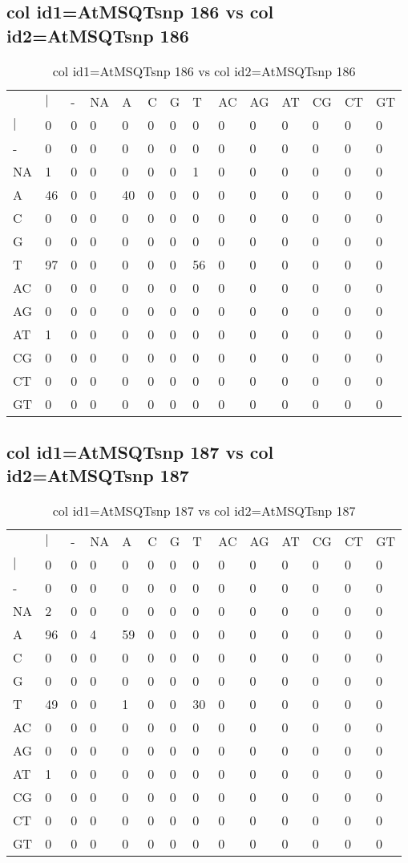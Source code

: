 \subsection{col id1=AtMSQTsnp 186 vs col id2=AtMSQTsnp 186}
\begin{center}
\begin{longtable}{|l|l|l|l|l|l|l|l|l|l|l|l|l|l|}
\caption{col id1=AtMSQTsnp 186 vs col id2=AtMSQTsnp 186} \label{table_dm554}\\
\hline
\\
\hline
&$|$&-&NA&A&C&G&T&AC&AG&AT&CG&CT&GT\\
$|$&0&0&0&0&0&0&0&0&0&0&0&0&0\\
-&0&0&0&0&0&0&0&0&0&0&0&0&0\\
NA&1&0&0&0&0&0&1&0&0&0&0&0&0\\
A&46&0&0&40&0&0&0&0&0&0&0&0&0\\
C&0&0&0&0&0&0&0&0&0&0&0&0&0\\
G&0&0&0&0&0&0&0&0&0&0&0&0&0\\
T&97&0&0&0&0&0&56&0&0&0&0&0&0\\
AC&0&0&0&0&0&0&0&0&0&0&0&0&0\\
AG&0&0&0&0&0&0&0&0&0&0&0&0&0\\
AT&1&0&0&0&0&0&0&0&0&0&0&0&0\\
CG&0&0&0&0&0&0&0&0&0&0&0&0&0\\
CT&0&0&0&0&0&0&0&0&0&0&0&0&0\\
GT&0&0&0&0&0&0&0&0&0&0&0&0&0\\
\hline
\end{longtable}
\end{center}

\subsection{col id1=AtMSQTsnp 187 vs col id2=AtMSQTsnp 187}
\begin{center}
\begin{longtable}{|l|l|l|l|l|l|l|l|l|l|l|l|l|l|}
\caption{col id1=AtMSQTsnp 187 vs col id2=AtMSQTsnp 187} \label{table_dm556}\\
\hline
\\
\hline
&$|$&-&NA&A&C&G&T&AC&AG&AT&CG&CT&GT\\
$|$&0&0&0&0&0&0&0&0&0&0&0&0&0\\
-&0&0&0&0&0&0&0&0&0&0&0&0&0\\
NA&2&0&0&0&0&0&0&0&0&0&0&0&0\\
A&96&0&4&59&0&0&0&0&0&0&0&0&0\\
C&0&0&0&0&0&0&0&0&0&0&0&0&0\\
G&0&0&0&0&0&0&0&0&0&0&0&0&0\\
T&49&0&0&1&0&0&30&0&0&0&0&0&0\\
AC&0&0&0&0&0&0&0&0&0&0&0&0&0\\
AG&0&0&0&0&0&0&0&0&0&0&0&0&0\\
AT&1&0&0&0&0&0&0&0&0&0&0&0&0\\
CG&0&0&0&0&0&0&0&0&0&0&0&0&0\\
CT&0&0&0&0&0&0&0&0&0&0&0&0&0\\
GT&0&0&0&0&0&0&0&0&0&0&0&0&0\\
\hline
\end{longtable}
\end{center}

